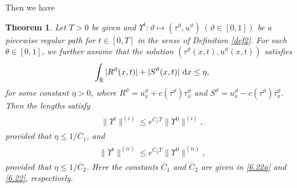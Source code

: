 \documentclass[11pt,reqno]{article}
\newtheorem{thm}{Theorem}
\numberwithin{equation}{section}
\begin{document}
Then we have
\begin{thm}\label{thm4}
Let $T>0$ be given and $\Upsilon^t: \vartheta\mapsto (\tau^\vartheta, u^\vartheta)\ (\vartheta\in[0,1])$ be a piecewise regular path for $t\in[0, T]$ in the sense of Definition \ref{def2}. For each $\theta\in[0,1]$, we further assume that the solution $(\tau^\vartheta(x,t), u^\vartheta(x,t))$ satisfies
\begin{align}\label{7.21}
\begin{split}
\int_{\mathbb{R}}|R^\vartheta(x, t)|+|S^\vartheta(x, t)|\ {\rm d}x\leq  \eta,
\end{split}
\end{align}
for some constant $\eta>0$, where $R^\vartheta=u_{x}^\vartheta+c(\tau^\vartheta)\tau_{x}^\vartheta$ and $S^\vartheta=u_{x}^\vartheta-c(\tau^\vartheta)\tau_{x}^\vartheta$.
Then the lengths satisfy
\begin{align}\label{7.22}
\begin{split}
\|\Upsilon^t\|^{(i)}\leq e^{\overline{C}_1T} \|\Upsilon^0\|^{(i)},
\end{split}
\end{align}
provided that $\eta\leq 1/\overline{C}_1$, and
\begin{align}\label{7.23}
\begin{split}
\|\Upsilon^t\|^{(ii)}\leq e^{\overline{C}_2T} \|\Upsilon^0\|^{(ii)},
\end{split}
\end{align}
provided that $\eta\leq 1/\overline{C}_2$. Here the constants $\overline{C}_{1}$ and $\overline{C}_{2}$ are given in \eqref{6.22a} and \eqref{6.22}, respectively.
\end{thm}
\end{document}
